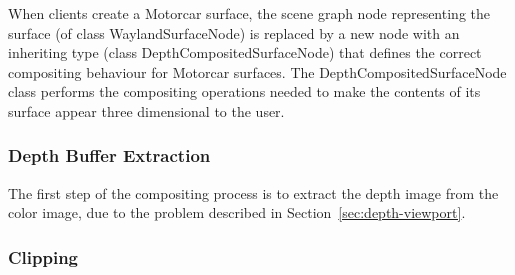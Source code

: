 When clients create a Motorcar surface, the scene graph node representing the surface (of class WaylandSurfaceNode) is replaced by a new node with an inheriting type (class DepthCompositedSurfaceNode)  that defines the correct compositing behaviour for Motorcar surfaces. The DepthCompositedSurfaceNode class performs the compositing operations needed to make the contents of its surface appear three dimensional to the user.

\subsubsection{Depth Buffer Extraction}

The first step of the compositing process is to extract the depth image from the color image, due to the problem described in Section~\ref{sec:depth-viewport}.

\subsubsection{Clipping}














